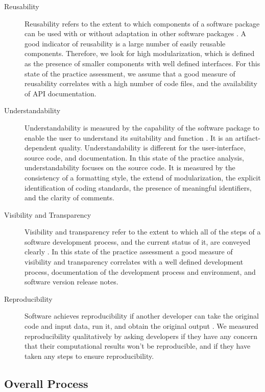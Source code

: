 \documentclass[final, 3p, times, authoryear]{elsarticle}
\begin{document}
\begin{description}
	\item[Reusability] Reusability refers to the extent to which components of a
	software package can be used with or without adaptation in other software
	packages \citep{kalagiakos2003non}. A good indicator of reusability is a
	large number of easily reusable components. Therefore, we look for high
	modularization, which is defined as the presence of smaller components with
	well defined interfaces. For this state of the practice assessment, we
	assume that a good measure of reusability correlates with a high
	number of code files, and the availability of API documentation.
	
	\item[Understandability] Understandability is measured by the capability of
	the software package to enable the user to understand its suitability and
	function \citep{ISO9126}. It is an artifact-dependent quality.
	Understandability is different for the user-interface, source code, and
	documentation. In this state of the practice analysis, understandability
	focuses on the source code. It is measured by the consistency of a
	formatting style, the extend of modularization, the explicit identification
	of coding standards, the presence of meaningful identifiers, and the clarity
	of comments. 
	
	\item[Visibility and Transparency] Visibility and transparency refer to the
	extent to which all of the steps of a software development process, and the
	current status of it, are conveyed clearly \citep[p.\ 32]{GhezziEtAl2003}.
	In this state of the practice assessment a good measure of visibility and
	transparency correlates with a well defined development process,
	documentation of the development process and environment, and software
	version release notes.
	
	\item[Reproducibility] Software achieves reproducibility if another
	developer can take the original code and input data, run it, and obtain the
	original output \citep{BenureauAndRougier2017}. We measured reproducibility
	qualitatively by asking developers if they have any concern that their
	computational results won't be reproducible, and if they have taken any
	steps to ensure reproducibility.
					 
\end{description}

\subsection{Overall Process} \label{Sec_OverallProcess}
\end{document}
